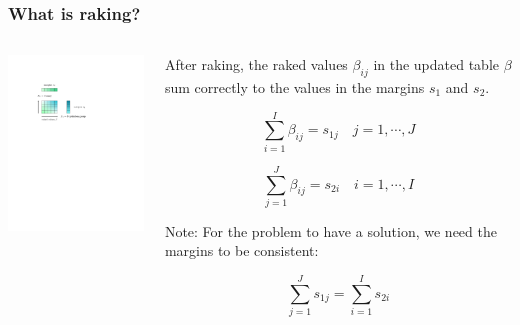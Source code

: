 \documentclass[aspectratio=169]{beamer}
\begin{document}
\begin{frame}
	\frametitle{What is raking?}
	\begin{columns}
	\begin{column}{.5\textwidth}
		\centering
		\includegraphics[width=7cm, trim={4.5cm 18cm 9cm 4.5cm},clip]{raking_2D_after.pdf}
	\end{column}

	\begin{column}{.5\textwidth}
		After raking, the raked values $\beta_{ij}$ in the updated table $\beta$ sum correctly to the values in the margins $s_1$ and $s_2$.

		\begin{equation*}
		\sum_{i = 1}^I \beta_{ij} = s_{1j} \quad j = 1 , \cdots , J
		\end{equation*}

		\begin{equation*}
		\sum_{j = 1}^J \beta_{ij} = s_{2i} \quad i = 1 , \cdots , I
		\end{equation*}

		\vspace{1em}

		Note: For the problem to have a solution, we need the margins to be consistent:

		\begin{equation*}
		\sum_{j = 1}^J s_{1j} = \sum_{i = 1}^I s_{2i}
		\end{equation*}
	\end{column}
	\end{columns}
\end{frame}
\end{document}
